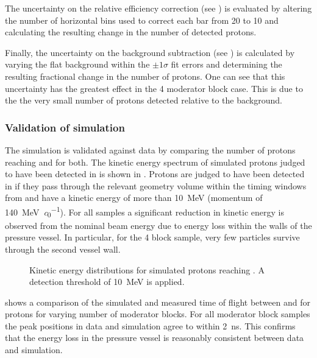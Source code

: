 The uncertainty on the \SFour relative efficiency correction (see ) is evaluated by altering the number of horizontal bins used to correct each bar from 20 to 10 and calculating the resulting change in the number of detected \SFour protons.

Finally, the uncertainty on the \SFour background subtraction (see ) is calculated by varying the flat background within the $\pm 1 \sigma$ fit errors and determining the resulting fractional change in the number of \SFour protons.
One can see that this uncertainty has the greatest effect in the 4 moderator block case.
This is due to the the very small number of protons detected relative to the background.

\subsubsection{Validation of simulation}
\label{sec:hptpc_beam_flux:results:MCData:validation}

The simulation is validated against data by comparing the number of protons reaching \SThree and \SFour for both.
The kinetic energy spectrum of simulated protons judged to have been detected in \SFour is shown in .
Protons are judged to have been detected in \SFour if they pass through the relevant geometry volume within the timing windows from  and have a kinetic energy of more than \SI{10}{\mega\electronvolt} (momentum of \SI{140}{\mega\electronvolt\per\clight}).
For all samples a significant reduction in kinetic energy is observed from the nominal beam energy due to energy loss within the walls of the pressure vessel.
In particular, for the 4 block sample, very few particles survive through the second vessel wall.

\begin{figure}[h]
  \begin{adjustbox}{max totalsize=.7\textwidth, center}
    
  \end{adjustbox}
  \caption[Kinetic energy distributions for simulated protons reaching \SFour.]{Kinetic energy distributions for simulated protons reaching \SFour. A detection threshold of \SI{10}{\mega\electronvolt} is applied. }
  \label{fig:protonS4Sim}
\end{figure}

 shows a comparison of the simulated and measured time of flight between \STwo and \SFour for protons for varying number of moderator blocks.
For all moderator block samples the peak positions in data and simulation agree to within \SI{2}{\nano\second}.
This confirms that the energy loss in the pressure vessel is reasonably consistent between data and simulation.

